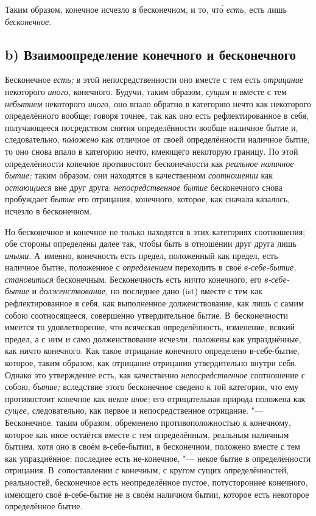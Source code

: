 Таким образом, конечное исчезло в бесконечном,
и то, чт\'{о} {\em есть,} есть лишь {\em бесконечное}.

\subsection[b) Взаимоопределение конечного и бесконечного]%
{b) Взаимоопределение конечного и бесконечного}

Бесконечное {\em есть;} в этой непосредственности оно
вместе с тем есть {\em отрицание} некоторого
{\em иного,} конечного. Будучи, таким образом,
{\em сущим} и вместе с тем {\em небытием} некоторого
{\em иного,} оно впало обратно в категорию нечто как
некоторого определённого вообще; говоря точнее, так как оно есть
рефлектированное в себя, получающееся посредством снятия определённости
вообще наличное бытие и, следовательно, {\em положено}
как отличное от своей определённости наличное бытие, то оно снова впало в
категорию нечто, имеющего некоторую границу. По этой определённости
конечное противостоит бесконечности как {\em реальное
наличное бытие;} таким образом, они находятся в качественном
{\em соотношении} как
{\em остающиеся} вне друг друга:
{\em непосредственное бытие} бесконечного снова
пробуждает {\em бытие} его отрицания, конечного,
которое, как сначала казалось, исчезло в бесконечном.

Но бесконечное и конечное не только находятся в этих категориях соотношения;
обе стороны определены далее так, чтобы быть в отношении друг друга лишь
{\em иными}. А~именно, конечность есть предел,
положенный как предел, есть наличное бытие, положенное с
{\em определением} переходить в своё
{\em в-себе-бытие,}
{\em становиться} бесконечным. Бесконечность есть ничто
конечного, его {\em в-себе-бытие} и
{\em долженствование,} но последнее дано (ist) вместе с
тем как рефлектированное в себя, как выполненное долженствование, как лишь
с самим собою соотносящееся, совершенно утвердительное бытие.
В~бесконечности имеется то удовлетворение, что всяческая определённость,
изменение, всякий предел, а с ним и само долженствование исчезли, положены
как упразднённые, как ничто конечного. Как такое отрицание конечного
определено в-себе-бытие, которое, таким образом, как отрицание отрицания
утвердительно внутри себя. Однако это утверждение есть, как качественно
{\em непосредственное} соотношение с собою,
{\em бытие;} вследствие этого бесконечное сведено к той
категории, что ему противостоит конечное как некое
{\em иное;} его отрицательная природа положена как
{\em сущее,} следовательно, как первое и
непосредственное отрицание. "--- Бесконечное, таким образом, обременено
противоположностью к конечному, которое как иное остаётся вместе с тем
определённым, реальным наличным бытием, хотя оно в своём в-себе-бытии, в
бесконечном, положено вместе с тем как упразднённое; последнее есть
не-конечное, "--- некое бытие в определённости отрицания. В~сопоставлении с
конечным, с кругом сущих определённостей, реальностей, бесконечное есть
неопределённое пустое, потустороннее конечного, имеющего своё в-себе-бытие
не в своём наличном бытии, которое есть некоторое определённое бытие.

